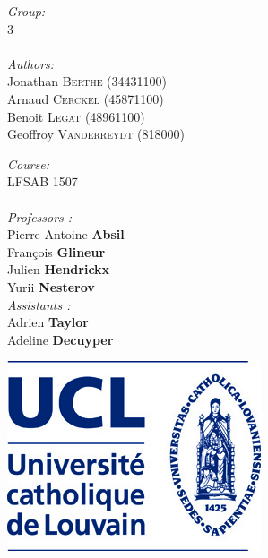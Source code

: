 \begin{titlepage}
\begin{figure}[h!]
\begin{subfigure}{0.4\textwidth}
\end{subfigure}
\end{figure}
\vfill
\begin{minipage}{0.5\textwidth}
\begin{flushleft} \large
\emph{Group:} \\
3\\
~\\
\emph{Authors:}\\
Jonathan \textsc{Berthe} (34431100)\\
Arnaud \textsc{Cerckel} (45871100)\\
Benoit \textsc{Legat} (48961100)\\
Geoffroy \textsc{Vanderreydt} (818000)\\
\end{flushleft}
\end{minipage}
\begin{minipage}{0.5\textwidth}
\begin{flushright} \large
\emph{Course:} \\
LFSAB 1507\\
~\\
\emph{Professors :} \\
Pierre-Antoine \textbf{Absil}\\
François \textbf{Glineur}\\
Julien \textbf{Hendrickx}\\
Yurii \textbf{Nesterov}\\
\emph{Assistants :}\\
Adrien \textbf{Taylor}\\
Adeline \textbf{Decuyper}
\end{flushright}
\end{minipage}
\vfill
\begin{center}
\begin{minipage}{0.25\textwidth}
\begin{flushleft}
\includegraphics[scale=0.25]{Couverture/ucl-logo.jpg}
\end{flushleft}

\end{minipage}
\end{center}
\end{titlepage}
